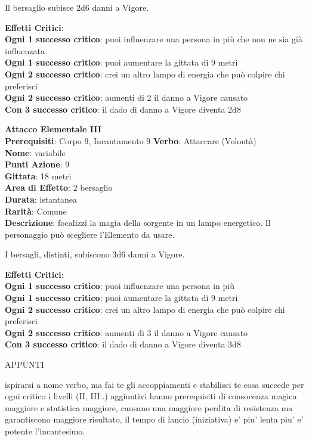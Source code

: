 \documentclass[12pt,a4paper,twoside,openany]{book}
\begin{document}
\begin{multicols}{2}
Il bersaglio subisce 2d6 danni a Vigore.


\textbf{Effetti Critici}:\\
\textbf{Ogni 1 successo critico}: puoi influenzare una persona in più che non ne sia già influenzata\\
\textbf{Ogni 1 successo critico}: puoi aumentare la gittata di 9 metri\\
\textbf{Ogni 2 successo critico}: crei un altro lampo di energia che può colpire chi preferisci\\
\textbf{Ogni 2 successo critico}: aumenti di 2 il danno a Vigore causato\\
\textbf{Con 3 successo critico}: il dado di danno a Vigore diventa 2d8

\textbf{Attacco Elementale III}\\
\textbf{Prerequisiti}: Corpo 9, Incantamento 9
\textbf{Verbo}: Attaccare (Volontà)\\
\textbf{Nome}: variabile\\
\textbf{Punti Azione}: 9\\
\textbf{Gittata}: 18 metri\\
\textbf{Area di Effetto}: 2 bersaglio\\
\textbf{Durata}: istantanea\\
\textbf{Rarità}: Comune\\
\textbf{Descrizione}: focalizzi la magia della sorgente in un lampo energetico. Il personaggio può scegliere l'Elemento da usare.

I bersagli, distinti, subiscono 3d6 danni a Vigore.


\textbf{Effetti Critici}:\\
\textbf{Ogni 1 successo critico}: puoi influenzare una persona in più \\
\textbf{Ogni 1 successo critico}: puoi aumentare la gittata di 9 metri\\
\textbf{Ogni 2 successo critico}: crei un altro lampo di energia che può colpire chi preferisci\\
\textbf{Ogni 2 successo critico}: aumenti di 3 il danno a Vigore causato\\
\textbf{Con 3 successo critico}: il dado di danno a Vigore diventa 3d8

\end{multicols}

\pagebreak

APPUNTI
\pagebreak
\pagebreak



ispirarsi a nome verbo, ma fai te gli accoppiamenti e stabilisci te cosa succede per ogni critico 
i livelli (II, III..) aggiuntivi hanno prerequisiti di consocenza magica maggiore e statistica maggiore, causano una maggiore perdita di resistenza ma garantiscono maggiore risultato, il tempo di lancio (iniziativa) e' piu' lenta piu' e' potente l'incantesimo.
\end{document}
